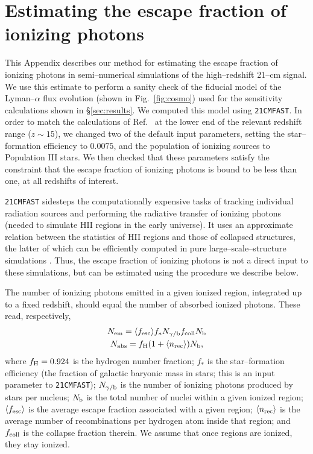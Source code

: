 \documentclass[aps,prd,twocolumn,floatfix,showpacs,superscriptaddress,nofootinbib]{revtex4-1}
\newcommand{\beq}{\begin{equation}}
\newcommand{\eeq}{\end{equation}}
\newcommand{\bga}{\begin{gathered}}
\newcommand{\ega}{\end{gathered}}
\begin{document}
\section{Estimating the escape fraction of ionizing photons}
\label{app:fesc}
This Appendix describes our method for estimating the escape fraction of ionizing photons in semi--numerical simulations of the high--redshift 21--cm signal. We use this estimate to perform a sanity check of the fiducial model of the Lyman--$\alpha$ flux evolution (shown in Fig.~\ref{fig:cosmo}) used for the sensitivity calculations shown in \S\ref{sec:results}. We computed this model using \texttt{21CMFAST}. In order to match the calculations of Ref.~\cite{2012ApJ...746..125H} at the lower end of the relevant redshift range ($z\sim 15$), we changed two of the default input parameters, setting the star--formation efficiency to $0.0075$, and the population of ionizing sources to Population III stars. We then checked that these parameters satisfy the constraint that the escape fraction of ionizing photons is bound to be less than one, at all redshifts of interest. 

\texttt{21CMFAST} sidesteps the computationally expensive tasks of tracking individual radiation sources and performing the radiative transfer of ionizing photons (needed to simulate HII regions in the early universe). It uses an approximate relation between the statistics of HII regions and those of collapsed structures, the latter of which can be efficiently computed in pure large--scale--structure simulations \cite{2004ApJ...613....1F}. Thus, the escape fraction of ionizing photons is not a direct input to these simulations, but can be estimated using the procedure we describe below. 

The number of ionizing photons emitted in a given ionized region, integrated up to a fixed redshift, should equal the number of absorbed ionized photons. These read, respectively, 
\beq    
\bga
N_{\rm em} = \langle f_{\rm esc} \rangle f_\ast N_{\gamma/{\rm b}} f_{\rm coll} N_{\rm b}\\
N_{\rm abs} = f_{\rm H} (1 + \langle n_{\rm rec} \rangle) N_{\rm b},
\ega
\label{eq:pbalance}
\eeq 
where $f_{\rm H} = 0.924$ is the hydrogen number fraction; $f_\ast$ is the star--formation efficiency (the fraction of galactic baryonic mass in stars; this is an input parameter to \texttt{21CMFAST}); $N_{\gamma/{\rm b}}$ is the number of ionizing photons produced by stars per nucleus; $N_{\rm b}$ is the total number of nuclei within a given ionized region; $\langle f_{\rm esc} \rangle$ is the average escape fraction associated with a given region; $\langle n_{\rm rec} \rangle$ is the average number of recombinations per hydrogen atom inside that region; and $f_{\rm coll}$ is the collapse fraction therein. We assume that once regions are ionized, they stay ionized. 
\end{document}

